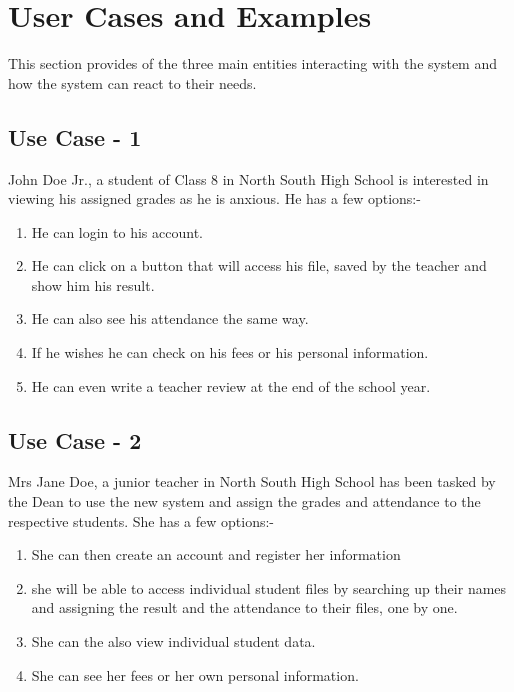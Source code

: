 \documentclass[a4paper,12pt]{article}
\begin{document}
\section{User Cases and Examples}
\enlargethispage{\baselineskip}
This section provides of the three main entities interacting with the system and how the system can react to their needs.

\subsection{Use Case - 1}
\enlargethispage{\baselineskip}
John Doe Jr., a student of Class 8 in North South High School is interested in viewing his assigned grades as he is anxious. He has a few options:- 
\begin{enumerate}
    \item He can login to his account.
    \item He can click on a button that will access his file, saved by the teacher and show him his result.
    \item He can also see his attendance the same way.
    \item If he wishes he can check on his fees or his personal information.
   \baselineskip
   \item  He can even write a teacher review at the end of the school year.
\end{enumerate}  


\subsection{Use Case - 2}
\enlargethispage{\baselineskip}
Mrs Jane Doe, a junior teacher in North South High School has been tasked by the Dean to use the new system and assign the grades and attendance to the respective students. She has a few options:- 
\begin{enumerate}
    \item She can then create an account and register her information
    \item she will be able to access individual student files by searching up their names and assigning the result and the attendance to their files, one by one.
    \item  She can the also view individual student data.
    \item She can see her fees or her own personal information. 
\end{enumerate}  
\newpage
\end{document}
